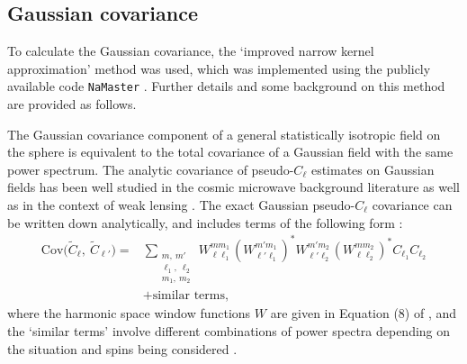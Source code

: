 \subsection{Gaussian covariance}

To calculate the Gaussian covariance, the `improved narrow kernel approximation' method \citep{Nicola2021} was used, which was implemented using the publicly available code \texttt{NaMaster} \citep{Alonso2019, Garcia-Garcia2019}. Further details and some background on this method are provided as follows.

The Gaussian covariance component of a general statistically isotropic field on the sphere is equivalent to the total covariance of a Gaussian field with the same power spectrum. The analytic covariance of pseudo-$C_\ell$ estimates on Gaussian fields has been well studied in the cosmic microwave background literature \citep{Efstathiou2004, Challinor2005, Brown2005} as well as in the context of weak lensing \citep{Garcia-Garcia2019, Nicola2021}. The exact Gaussian pseudo-$C_\ell$ covariance can be written down analytically, and includes terms of the following form \citep[e.g.][]{Brown2005}:
\begin{equation}
\begin{aligned}
\text{Cov} \Big( \widetilde{C}_\ell,~ \widetilde{C}_{\ell'} \Big) =
&\sum_{\substack{m,~m'\\\ell_1,~\ell_2\\m_1,~m_2}}
W_{\ell \ell_1}^{m m_1} \left( W_{\ell' \ell_1}^{m' m_1} \right)^*
W_{\ell' \ell_2}^{m' m_2} \left( W_{\ell \ell_2}^{m m_2} \right)^*
C_{\ell_1} C_{\ell_2} \\
&+ \text{similar terms},
\end{aligned}
\label{cov_eqn:pcl_cov}
\end{equation}
where the harmonic space window functions $W$ are given in Equation (8) of \citet{Brown2005}, and the `similar terms' involve different combinations of power spectra depending on the situation and spins being considered \citep{Hansen2003, Challinor2005}.

